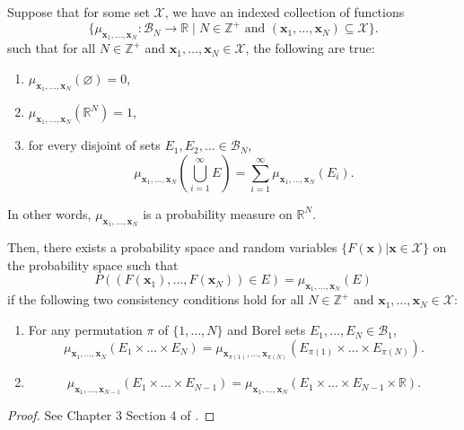 \begin{theorem}\label{thm:kol-ext}
    Suppose that for some set $\mathcal{X}$, we have an indexed collection of functions
    \begin{equation*}
        \{ \mu_{\mathbf{x}_1, \dots, \mathbf{x}_N} : \mathcal{B}_{N} \to \mathbb{R} \;|\; N \in \mathbb{Z}^{+} \text{ and } (\mathbf{x}_1, \dots, \mathbf{x}_N) \subseteq \mathcal{X}\}.
    \end{equation*}
    such that for all $N \in \mathbb{Z}^{+}$ and $\mathbf{x}_1, \dots, \mathbf{x}_N \in \mathcal{X}$,
    the following are  true:
    \begin{enumerate}
        \item $\mu_{\mathbf{x}_1, \dots, \mathbf{x}_N}( \varnothing) = 0$,
        \item $\mu_{\mathbf{x}_1, \dots, \mathbf{x}_N}(\mathbb{R}^{N}) = 1$,
        \item for every disjoint of sets $E_1, E_2, \dots \in \mathcal{B}_N$,
            \begin{equation*}
                \mu_{\mathbf{x}_1, \dots, \mathbf{x}_N}\left(\bigcup_{i = 1}^{\infty}
                E\right) = \sum_{i = 1}^{\infty}\mu_{\mathbf{x}_1, \dots, \mathbf{x}_N}(E_i).
            \end{equation*}
    \end{enumerate}
    In other words, $\mu_{\mathbf{x}_1, \dots, \mathbf{x}_N}$ is a probability measure on $\mathbb{R}^{N}$.

    Then, there exists a probability space and random variables $\{ F(\mathbf{x}) | \mathbf{x} \in \mathcal{X} \}$
    on the probability space such that
    \begin{equation*}
        P((F(\mathbf{x}_1), \dots, F(\mathbf{x}_N)) \in E) = \mu_{\mathbf{x}_1, \dots, \mathbf{x}_N}(E)
    \end{equation*}
    if the following two consistency conditions hold for all $N \in \mathbb{Z}^{+}$ and $\mathbf{x}_1, \dots, \mathbf{x}_N \in \mathcal{X}$:
    \begin{enumerate}
        \item For any permutation $\pi$ of $\{ 1, \dots, N \}$ and Borel sets $E_1, \dots, E_N \in \mathcal{B}_1$,
            \begin{equation*}
                \mu_{\mathbf{x}_1, \dots, \mathbf{x}_N}(E_1 \times \dots \times E_N)
                =\mu_{\mathbf{x}_{\pi(1)}, \dots, \mathbf{x}_{\pi(N)}}\left(E_{\pi(1)} \times \dots \times E_{\pi(N)}\right).
            \end{equation*}
        \item
            \begin{equation*}
                \mu_{\mathbf{x}_1, \dots, \mathbf{x}_{N - 1}}(E_1 \times \dots \times E_{N - 1})
                =
                \mu_{\mathbf{x}_1, \dots, \mathbf{x}_N}(E_1 \times \dots \times E_{N - 1} \times \mathbb{R}).
            \end{equation*}
    \end{enumerate}
\end{theorem}
\begin{proof}
    See Chapter 3 Section 4 of \cite{kolmogorov1933}.
\end{proof}

